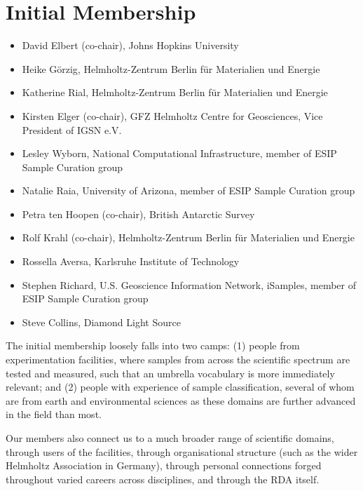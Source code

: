 \documentclass{scrartcl}
\begin{document}
\section{Initial Membership}

\begin{itemize}
\item David Elbert (co-chair), Johns Hopkins University
\item Heike Görzig,
  Helmholtz-Zentrum Berlin für Materialien und Energie
\item Katherine Rial,
  Helmholtz-Zentrum Berlin für Materialien und Energie
\item Kirsten Elger (co-chair),
  GFZ Helmholtz Centre for Geosciences, Vice President of IGSN e.V.
\item Lesley Wyborn,
  National Computational Infrastructure, member of ESIP Sample Curation group
\item Natalie Raia,
  University of Arizona, member of ESIP Sample Curation group
\item Petra ten Hoopen (co-chair), British Antarctic Survey
\item Rolf Krahl (co-chair),
  Helmholtz-Zentrum Berlin für Materialien und Energie
\item Rossella Aversa, Karlsruhe Institute of Technology
\item Stephen Richard,
  U.S. Geoscience Information Network, iSamples,
  member of ESIP Sample Curation group
\item Steve Collins, Diamond Light Source
\end{itemize}

The initial membership loosely falls into two camps: (1) people from
experimentation facilities, where samples from across the scientific
spectrum are tested and measured, such that an umbrella vocabulary is
more immediately relevant; and (2) people with experience of sample
classification, several of whom are from earth and environmental
sciences as these domains are further advanced in the field than most.

Our members also connect us to a much broader range of scientific
domains, through users of the facilities, through organisational
structure (such as the wider Helmholtz Association in Germany),
through personal connections forged throughout varied careers across
disciplines, and through the RDA itself.
\end{document}
